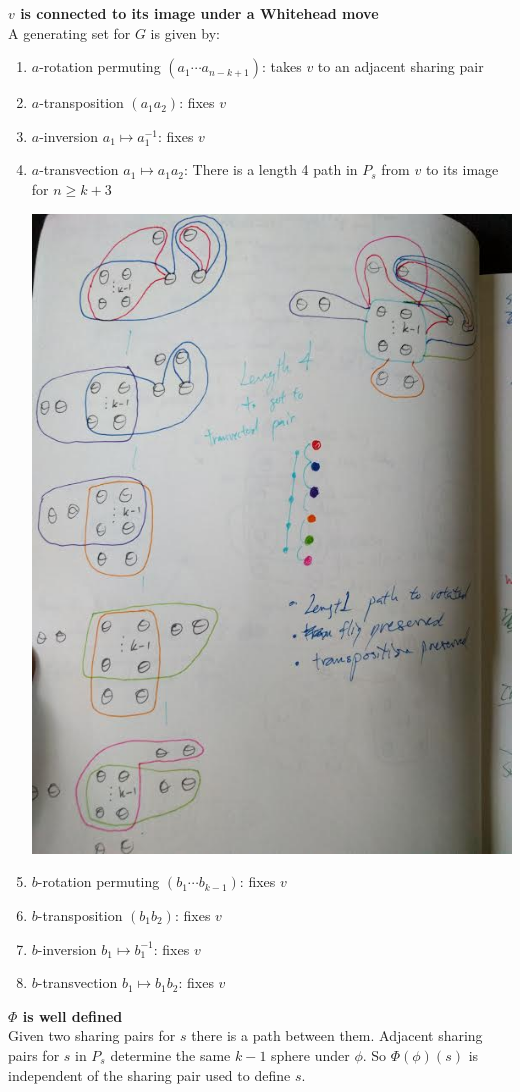 \documentclass[12pt]{article}
\begin{document}
 
\noindent \textbf{$v$ is connected to its image under a Whitehead move}\\
 
A generating set for $G$ is given by:
\begin{enumerate}
\item $a$-rotation permuting $(a_1 \cdots a_{n-k+1})$: takes $v$ to an adjacent sharing pair
\item $a$-transposition $(a_1 a_2)$: fixes $v$
\item $a$-inversion $a_1 \mapsto a_1^{-1}$: fixes $v$
\item $a$-transvection $a_1 \mapsto a_1a_2$:
There is a length 4 path in $P_s$ from $v$ to its image for $n\geq k+3$

\includegraphics[width=.6\textwidth]{transvect.jpg}

\item $b$-rotation permuting $(b_1 \cdots b_{k-1})$: fixes $v$
\item $b$-transposition $(b_1 b_2)$: fixes $v$
\item $b$-inversion $b_1 \mapsto b_1^{-1}$: fixes $v$
\item $b$-transvection $b_1 \mapsto b_1b_2$: fixes $v$
\end{enumerate}

\noindent \textbf{$\Phi$ is well defined}\\
Given two sharing pairs for $s$ there is a path between them.
Adjacent sharing pairs for $s$ in $P_s$ determine the same $k-1$ sphere under $\phi$.
So $\Phi(\phi)(s)$ is independent of the sharing pair used to define $s$.\\
\end{document}
